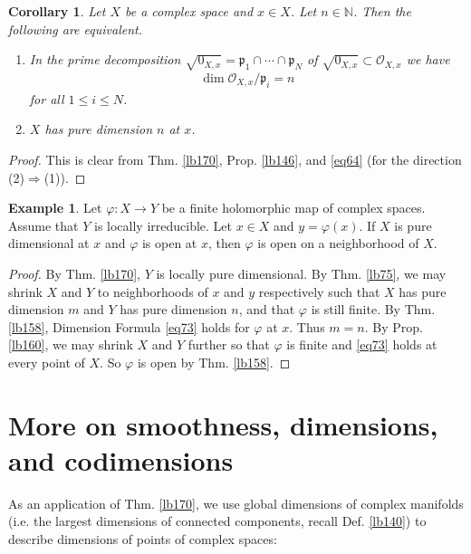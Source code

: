 \documentclass[12pt,b5paper,notitlepage]{report}
\theoremstyle{definition}
\newtheorem{eg}[df]{Example}
\theoremstyle{plain}
\newtheorem{co}[df]{Corollary}
\newcommand{\scr}{\mathscr}
\newcommand{\pk}{\mathfrak p}
\newcommand{\Nbb}{\mathbb N}
\numberwithin{equation}{section}
\begin{document}
\begin{co}
Let $X$ be a complex space and $x\in X$. Let $n\in\Nbb$. Then the following are equivalent.
\begin{enumerate}[label=(\arabic*)]
\item In the prime decomposition $\sqrt{0_{X,x}}=\pk_1\cap\cdots\cap\pk_N$ of $\sqrt{0_{X,x}}\subset\scr O_{X,x}$ we have
\begin{align*}
\dim \scr O_{X,x}/\pk_i=n
\end{align*}
for all $1\leq i\leq N$.
\item $X$ has pure dimension $n$ at $x$.
\end{enumerate}
\end{co}

\begin{proof}
This is clear from Thm. \ref{lb170}, Prop. \ref{lb146}, and \eqref{eq64} (for the direction (2)$\Rightarrow$(1)).
\end{proof}






\begin{eg}
Let $\varphi:X\rightarrow Y$ be a finite holomorphic map of complex spaces. Assume that $Y$ is locally irreducible. Let $x\in X$ and $y=\varphi(x)$. If $X$ is pure dimensional at $x$ and $\varphi$ is open at $x$, then $\varphi$ is open on a neighborhood of $X$. 
\end{eg}


\begin{proof}
By Thm. \ref{lb170}, $Y$ is locally pure dimensional. By Thm. \ref{lb75}, we may shrink $X$ and $Y$ to neighborhoods of $x$ and $y$ respectively such that $X$ has pure dimension $m$ and $Y$ has pure dimension $n$, and that $\varphi$ is still finite. By Thm. \ref{lb158}, Dimension Formula \eqref{eq73} holds for $\varphi$ at $x$. Thus $m=n$. By Prop. \ref{lb160}, we may shrink $X$ and $Y$ further so that $\varphi$ is finite and \eqref{eq73} holds at every point of $X$. So $\varphi$ is open by Thm. \ref{lb158}.
\end{proof}



\section{More on smoothness, dimensions, and codimensions}



As an application of Thm. \ref{lb170}, we use global dimensions of complex manifolds (i.e. the largest dimensions of connected components, recall Def. \ref{lb140}) to describe dimensions of points of complex spaces:
\end{document}
